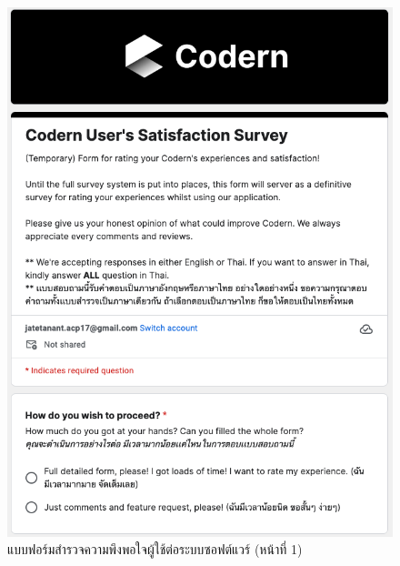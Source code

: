 \documentclass[12pt,one side,openright,a4paper]{cpe-thesis-th}
\begin{document}
\begin{figure}[H]
  \centering
  \includegraphics[width=15cm]{figure/results/forms/survey-google-p1.png}
  \caption[แบบฟอร์มสำรวจความพึงพอใจผู้ใช้ต่อระบบซอฟต์แวร์ (หน้าที่ 1)]{แบบฟอร์มสำรวจความพึงพอใจผู้ใช้ต่อระบบซอฟต์แวร์ (หน้าที่ 1)}
\end{figure}
\end{document}
